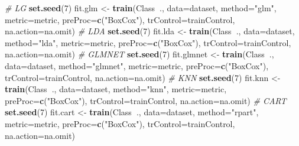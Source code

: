 \documentclass[]{book}
\newenvironment{Shaded}{\begin{snugshade}}{\end{snugshade}}
\newcommand{\CommentTok}[1]{\textcolor[rgb]{0.56,0.35,0.01}{\textit{#1}}}
\newcommand{\DataTypeTok}[1]{\textcolor[rgb]{0.13,0.29,0.53}{#1}}
\newcommand{\DecValTok}[1]{\textcolor[rgb]{0.00,0.00,0.81}{#1}}
\newcommand{\KeywordTok}[1]{\textcolor[rgb]{0.13,0.29,0.53}{\textbf{#1}}}
\newcommand{\NormalTok}[1]{#1}
\newcommand{\OperatorTok}[1]{\textcolor[rgb]{0.81,0.36,0.00}{\textbf{#1}}}
\newcommand{\StringTok}[1]{\textcolor[rgb]{0.31,0.60,0.02}{#1}}
\begin{document}
\begin{Shaded}
\begin{Highlighting}[]
\CommentTok{# LG}
\KeywordTok{set.seed}\NormalTok{(}\DecValTok{7}\NormalTok{)}
\NormalTok{fit.glm <-}\StringTok{ }\KeywordTok{train}\NormalTok{(Class}\OperatorTok{~}\NormalTok{., }\DataTypeTok{data=}\NormalTok{dataset, }\DataTypeTok{method=}\StringTok{"glm"}\NormalTok{, }\DataTypeTok{metric=}\NormalTok{metric, }
                 \DataTypeTok{preProc=}\KeywordTok{c}\NormalTok{(}\StringTok{"BoxCox"}\NormalTok{), }\DataTypeTok{trControl=}\NormalTok{trainControl, }\DataTypeTok{na.action=}\NormalTok{na.omit)}
\CommentTok{# LDA}
\KeywordTok{set.seed}\NormalTok{(}\DecValTok{7}\NormalTok{)}
\NormalTok{fit.lda <-}\StringTok{ }\KeywordTok{train}\NormalTok{(Class}\OperatorTok{~}\NormalTok{., }\DataTypeTok{data=}\NormalTok{dataset, }\DataTypeTok{method=}\StringTok{"lda"}\NormalTok{, }\DataTypeTok{metric=}\NormalTok{metric,}
                 \DataTypeTok{preProc=}\KeywordTok{c}\NormalTok{(}\StringTok{"BoxCox"}\NormalTok{), }\DataTypeTok{trControl=}\NormalTok{trainControl, }\DataTypeTok{na.action=}\NormalTok{na.omit)}
\CommentTok{# GLMNET}
\KeywordTok{set.seed}\NormalTok{(}\DecValTok{7}\NormalTok{)}
\NormalTok{fit.glmnet <-}\StringTok{ }\KeywordTok{train}\NormalTok{(Class}\OperatorTok{~}\NormalTok{., }\DataTypeTok{data=}\NormalTok{dataset, }\DataTypeTok{method=}\StringTok{"glmnet"}\NormalTok{, }\DataTypeTok{metric=}\NormalTok{metric, }
                    \DataTypeTok{preProc=}\KeywordTok{c}\NormalTok{(}\StringTok{"BoxCox"}\NormalTok{), }\DataTypeTok{trControl=}\NormalTok{trainControl, }
                    \DataTypeTok{na.action=}\NormalTok{na.omit)}
\CommentTok{# KNN}
\KeywordTok{set.seed}\NormalTok{(}\DecValTok{7}\NormalTok{)}
\NormalTok{fit.knn <-}\StringTok{ }\KeywordTok{train}\NormalTok{(Class}\OperatorTok{~}\NormalTok{., }\DataTypeTok{data=}\NormalTok{dataset, }\DataTypeTok{method=}\StringTok{"knn"}\NormalTok{, }\DataTypeTok{metric=}\NormalTok{metric, }
                 \DataTypeTok{preProc=}\KeywordTok{c}\NormalTok{(}\StringTok{"BoxCox"}\NormalTok{), }\DataTypeTok{trControl=}\NormalTok{trainControl, }\DataTypeTok{na.action=}\NormalTok{na.omit)}
\CommentTok{# CART}
\KeywordTok{set.seed}\NormalTok{(}\DecValTok{7}\NormalTok{)}
\NormalTok{fit.cart <-}\StringTok{ }\KeywordTok{train}\NormalTok{(Class}\OperatorTok{~}\NormalTok{., }\DataTypeTok{data=}\NormalTok{dataset, }\DataTypeTok{method=}\StringTok{"rpart"}\NormalTok{, }\DataTypeTok{metric=}\NormalTok{metric, }
                  \DataTypeTok{preProc=}\KeywordTok{c}\NormalTok{(}\StringTok{"BoxCox"}\NormalTok{), }\DataTypeTok{trControl=}\NormalTok{trainControl, }
                  \DataTypeTok{na.action=}\NormalTok{na.omit)}

\end{Highlighting}
\end{Shaded}
\end{document}
